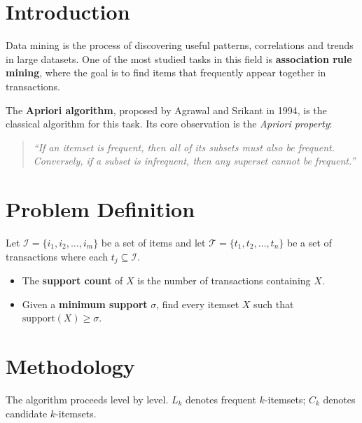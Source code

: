 \documentclass[11pt,a4paper]{article}
\begin{document}
\section{Introduction}
Data mining is the process of discovering useful patterns, correlations and
trends in large datasets. One of the most studied tasks in this field is
\textbf{association rule mining}, where the goal is to find items that
frequently appear together in transactions.

The \textbf{Apriori algorithm}, proposed by Agrawal and Srikant in 1994,
is the classical algorithm for this task. Its core observation is the
\emph{Apriori property}:

\begin{quote}
\itshape ``If an itemset is frequent, then all of its subsets must also be
frequent. Conversely, if a subset is infrequent, then any superset cannot
be frequent.''
\end{quote}

\section{Problem Definition}

Let $\mathcal{I} = \{i_1, i_2, \dots, i_m\}$ be a set of items and let
$\mathcal{T} = \{t_1, t_2, \dots, t_n\}$ be a set of transactions where
each $t_j \subseteq \mathcal{I}$.

\begin{itemize}[leftmargin=1.2em]
  \item The \textbf{support count} of $X$ is the number of transactions
        containing $X$.
  \item Given a \textbf{minimum support} $\sigma$, find every itemset $X$
        such that $\text{support}(X) \geq \sigma$.
\end{itemize}

\section{Methodology}

The algorithm proceeds level by level. $L_k$ denotes frequent
$k$-itemsets; $C_k$ denotes candidate $k$-itemsets.
\end{document}
